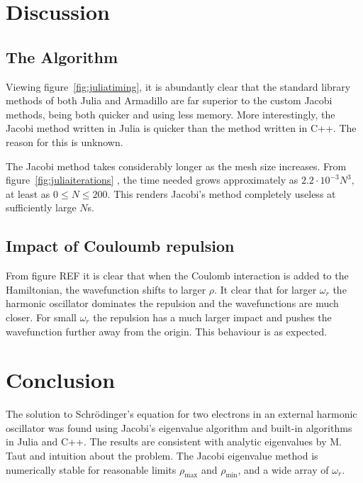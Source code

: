 \documentclass[aps,reprint]{revtex4-1}
\newcommand\blankpage{%
  \null
  \thispagestyle{empty}%
  \addtocounter{page}{-1}%
  \newpage}
\begin{document}
\section{Discussion}

\subsection{The Algorithm}
Viewing figure~\ref{fig:juliatiming}, it is abundantly clear that the standard
library methods of both Julia and Armadillo are far superior to the custom
Jacobi methods, being both quicker and using less memory. More interestingly,
the Jacobi method written in Julia is quicker than the method written in C++.
The reason for this is unknown.

The Jacobi method takes considerably longer as the mesh size increases. From
figure~\ref{fig:juliaiterations} , the time needed grows approximately as
\(2.2\cdot 10^{-3}N^{3}\), at least as \(0\leq N \leq 200\). This renders
Jacobi's method completely useless at sufficiently large \(N\)s.

\subsection{Impact of Couloumb repulsion}
From figure REF it is clear that when the Coulomb interaction is added to the
Hamiltonian, the wavefunction shifts to larger $\rho$.
It clear that for larger $\omega_r$ the harmonic oscillator dominates the repulsion
and the wavefunctions are much closer. For small $\omega_r$ the repulsion
has a much larger impact and pushes the wavefunction further away from the origin.
This behaviour is as expected.
\label{sec:discussion}
\section{Conclusion}
The solution to Schrödinger's equation for two electrons in an external
harmonic oscillator was found using Jacobi's eigenvalue algorithm and built-in
algorithms in Julia and C++. The results are consistent with analytic eigenvalues
by M. Taut and intuition about the problem. The Jacobi eigenvalue method is
numerically stable for reasonable limits $\rho_\text{max}$ and $\rho_\text{min}$,
and a wide array of $\omega_r$.
\label{sec:conclusion}

\blankpage
\appendix
\end{document}

